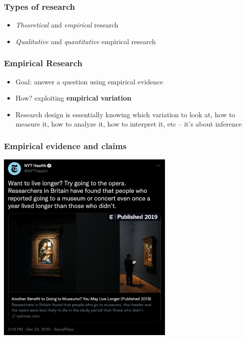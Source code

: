 \documentclass[aspectratio=43]{beamer}
\begin{document}
\begin{frame}
\frametitle{Types of research}
\centering

\begin{itemize}
  \item \textit{Theoretical} and \textit{empirical} research
  \item \textit{Qualitative} and \textit{quantitative} empirical research
\end{itemize}

\end{frame}

\begin{frame}
\frametitle{Empirical Research}
\centering

\begin{itemize}
  \item Goal: answer a question using empirical evidence
  \item How? exploiting \textbf{empirical variation}
  \item Research design is essentially knowing which variation to look at, how to measure it, how to analyze it, how to interpret it, etc -- it's about inference
\end{itemize}

\end{frame}

\begin{frame}
\frametitle{Empirical evidence and claims}
\centering

\includegraphics[width = 0.65\textwidth]{img/nyt_museums}

\end{frame}
\end{document}
